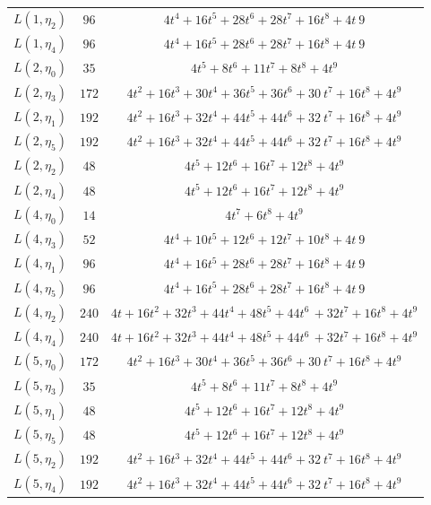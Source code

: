 \begin{center}
\begin{tabular}{c|c|c}
$L(1,\eta_{2})$ & $96$ & $4t^{4} + 16t^{5} + 28t^{6} + 28t^{7} + 16t^{8} + 4t^\
{9}$ \\
$L(1,\eta_{4})$ & $96$ & $4t^{4} + 16t^{5} + 28t^{6} + 28t^{7} + 16t^{8} + 4t^\
{9}$ \\
$L(2,\eta_{0})$ & $35$ & $4t^{5} + 8t^{6} + 11t^{7} + 8t^{8} + 4t^{9}$ \\
$L(2,\eta_{3})$ & $172$ & $4t^{2} + 16t^{3} + 30t^{4} + 36t^{5} + 36t^{6} + 30\
t^{7} + 16t^{8} + 4t^{9}$ \\
$L(2,\eta_{1})$ & $192$ & $4t^{2} + 16t^{3} + 32t^{4} + 44t^{5} + 44t^{6} + 32\
t^{7} + 16t^{8} + 4t^{9}$ \\
$L(2,\eta_{5})$ & $192$ & $4t^{2} + 16t^{3} + 32t^{4} + 44t^{5} + 44t^{6} + 32\
t^{7} + 16t^{8} + 4t^{9}$ \\
$L(2,\eta_{2})$ & $48$ & $4t^{5} + 12t^{6} + 16t^{7} + 12t^{8} + 4t^{9}$ \\
$L(2,\eta_{4})$ & $48$ & $4t^{5} + 12t^{6} + 16t^{7} + 12t^{8} + 4t^{9}$ \\
$L(4,\eta_{0})$ & $14$ & $4t^{7} + 6t^{8} + 4t^{9}$ \\
$L(4,\eta_{3})$ & $52$ & $4t^{4} + 10t^{5} + 12t^{6} + 12t^{7} + 10t^{8} + 4t^\
{9}$ \\
$L(4,\eta_{1})$ & $96$ & $4t^{4} + 16t^{5} + 28t^{6} + 28t^{7} + 16t^{8} + 4t^\
{9}$ \\
$L(4,\eta_{5})$ & $96$ & $4t^{4} + 16t^{5} + 28t^{6} + 28t^{7} + 16t^{8} + 4t^\
{9}$ \\
$L(4,\eta_{2})$ & $240$ & $4t + 16t^{2} + 32t^{3} + 44t^{4} + 48t^{5} + 44t^{6\
} + 32t^{7} + 16t^{8} + 4t^{9}$ \\
$L(4,\eta_{4})$ & $240$ & $4t + 16t^{2} + 32t^{3} + 44t^{4} + 48t^{5} + 44t^{6\
} + 32t^{7} + 16t^{8} + 4t^{9}$ \\
$L(5,\eta_{0})$ & $172$ & $4t^{2} + 16t^{3} + 30t^{4} + 36t^{5} + 36t^{6} + 30\
t^{7} + 16t^{8} + 4t^{9}$ \\
$L(5,\eta_{3})$ & $35$ & $4t^{5} + 8t^{6} + 11t^{7} + 8t^{8} + 4t^{9}$ \\
$L(5,\eta_{1})$ & $48$ & $4t^{5} + 12t^{6} + 16t^{7} + 12t^{8} + 4t^{9}$ \\
$L(5,\eta_{5})$ & $48$ & $4t^{5} + 12t^{6} + 16t^{7} + 12t^{8} + 4t^{9}$ \\
$L(5,\eta_{2})$ & $192$ & $4t^{2} + 16t^{3} + 32t^{4} + 44t^{5} + 44t^{6} + 32\
t^{7} + 16t^{8} + 4t^{9}$ \\
$L(5,\eta_{4})$ & $192$ & $4t^{2} + 16t^{3} + 32t^{4} + 44t^{5} + 44t^{6} + 32\
t^{7} + 16t^{8} + 4t^{9}$ \\
\hline
\end{tabular}
\end{center}

